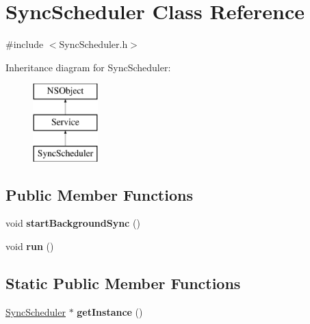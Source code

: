 \hypertarget{interface_sync_scheduler}{
\section{\-Sync\-Scheduler \-Class \-Reference}
\label{interface_sync_scheduler}
}


{\ttfamily \#include $<$\-Sync\-Scheduler.\-h$>$}

\-Inheritance diagram for \-Sync\-Scheduler\-:\begin{figure}[H]
\begin{center}
\leavevmode
\includegraphics[height=3.000000cm]{interface_sync_scheduler}
\end{center}
\end{figure}
\subsection*{\-Public \-Member \-Functions}
\begin{DoxyCompactItemize}
\item 
\hypertarget{interface_sync_scheduler_a6426a038015079a508ccafc72e754b1b}{
void {\bfseries start\-Background\-Sync} ()}
\label{interface_sync_scheduler_a6426a038015079a508ccafc72e754b1b}

\item 
\hypertarget{interface_sync_scheduler_afd65693c4d35ce51c33a3f71bba500fb}{
void {\bfseries run} ()}
\label{interface_sync_scheduler_afd65693c4d35ce51c33a3f71bba500fb}

\end{DoxyCompactItemize}
\subsection*{\-Static \-Public \-Member \-Functions}
\begin{DoxyCompactItemize}
\item 
\hypertarget{interface_sync_scheduler_a949dd9ba8a2e4dafa45193805b935495}{
\hyperlink{interface_sync_scheduler}{\-Sync\-Scheduler} $\ast$ {\bfseries get\-Instance} ()}
\label{interface_sync_scheduler_a949dd9ba8a2e4dafa45193805b935495}

\end{DoxyCompactItemize}


